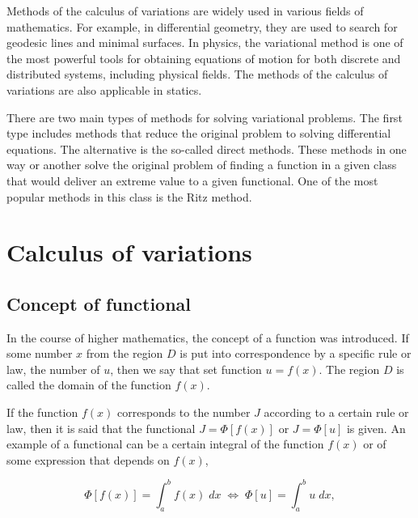 Methods of the calculus of variations are widely used in various fields of mathematics. For example, in differential geometry, they are used to search for geodesic lines and minimal surfaces. In physics, the variational method is one of the most powerful tools for obtaining equations of motion for both discrete and distributed systems, including physical fields. The methods of the calculus of variations are also applicable in statics.

There are two main types of methods for solving variational problems. The first type includes methods that reduce the original problem to solving differential equations. The alternative is the so-called direct methods. These methods in one way or another solve the original problem of finding a function in a given class that would deliver an extreme value to a given functional. One of the most popular methods in this class is the Ritz method.


\newpage

\section{Calculus of variations}

\subsection{Concept of functional}

In the course of higher mathematics, the concept of a function was introduced. If some number $x$ from the region $D$ is put into correspondence by a specific rule or law, the number of $u$, then we say that set function $u=f(x)$. The region $D$ is called the domain of the function $f(x)$.

If the function $f(x)$ corresponds to the number $J$ according to a certain rule or law, then it is said that the functional $J = \Phi[f(x)]$ or $J = \Phi[u]$ is given. An example of a functional can be a certain integral of the function $f(x)$ or of some expression that depends on $f(x)$,

\begin{displaymath}
	\Phi[f(x)] = \int_{a}^{b} f(x) \; dx \; \Leftrightarrow \; \Phi[u] = \int_{a}^{b} u \; dx,
\end{displaymath}

